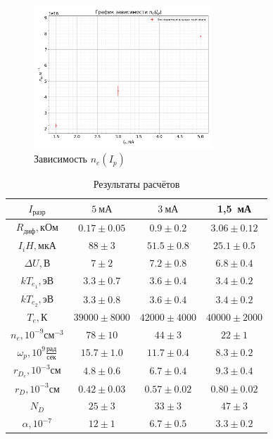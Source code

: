 \documentclass[a4paper, 12pt]{article}
\begin{document}
            \begin{figure}[!ht]
                \centering
                \includegraphics[width=0.6\textwidth]{img/n_e_I_p.png}
                \caption{Зависимость $n_e(I_p)$}
                \label{plot:n_e_I_p}
            \end{figure}


            \begin{table}[!ht]
                \centering
                \begin{tabular}{|c|c|c|c|}
                    \hline

                    $I_{разр}$ & $5~мА$ & $3~мА$ & 1,5~мА\\ \hline
                    $R_{диф}, кОм$ & $0.17 \pm 0.05$ & $0.9 \pm 0.2$ & $3.06 \pm 0.12$\\ \hline
                    $I_iH, мкА$ & $88 \pm 3$ & $51.5 \pm 0.8$ & $25.1 \pm 0.5$\\ \hline
                    $\Delta U, В$ & $7 \pm 2$ & $7.2 \pm 0.8$ & $6.8 \pm 0.4$\\ \hline
                    $kT_{e_1}, эВ$ & $3.3 \pm 0.7$ & $3.6 \pm 0.4$ & $3.4 \pm 0.2$\\ \hline
                    $kT_{e_2}, эВ$ & $3.3 \pm 0.8$ & $3.6 \pm 0.4$ & $3.4 \pm 0.2$\\ \hline
                    $T_e, К$ & $39000 \pm 8000$ & $42000 \pm 4000$ & $40000 \pm 2000$\\ \hline
                    $n_e, 10^{-9} см^{-3}$ & $78 \pm 10$ & $44 \pm 3$ & $22 \pm 1$\\ \hline
                    $\omega_p, 10^9 \frac{рад}{сек}$ & $15.7 \pm 1.0$ & $11.7 \pm 0.4$ & $8.3 \pm 0.2$\\ \hline
                    $r_{D_e}, 10^{-3} см$ & $4.8 \pm 0.6$ & $6.7 \pm 0.4$ & $9.3 \pm 0.4$\\ \hline
                    $r_D, 10^{-3} см$ & $0.42 \pm 0.03$ & $0.57 \pm 0.02$ & $0.80 \pm 0.02$\\ \hline
                    $N_D$ & $25 \pm 3$ & $33 \pm 3$ & $47 \pm 3$\\ \hline
                    $\alpha, 10^{-7}$ & $12 \pm 1$ & $6.7 \pm 0.5$ & $3.3 \pm 0.2$\\ \hline

                \end{tabular}
                \caption{Результаты расчётов}
                \label{tab:res_full}
            \end{table}
\end{document}
